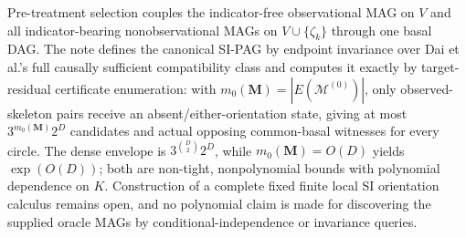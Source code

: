 Pre-treatment selection couples the indicator-free observational MAG on \(V\) and all indicator-bearing nonobservational MAGs on \(V\cup\{\zeta_k\}\) through one basal DAG.  The note defines the canonical SI-PAG by endpoint invariance over Dai et al.'s full causally sufficient compatibility class and computes it exactly by target-residual certificate enumeration: with \(m_0(\mathbf M)=|E(\mathcal M^{(0)})|\), only observed-skeleton pairs receive an absent/either-orientation state, giving at most \(3^{m_0(\mathbf M)}2^D\) candidates and actual opposing common-basal witnesses for every circle.  The dense envelope is \(3^{\binom D2}2^D\), while \(m_0(\mathbf M)=O(D)\) yields \(\exp(O(D))\); both are non-tight, nonpolynomial bounds with polynomial dependence on \(K\).  Construction of a complete fixed finite local SI orientation calculus remains open, and no polynomial claim is made for discovering the supplied oracle MAGs by conditional-independence or invariance queries.